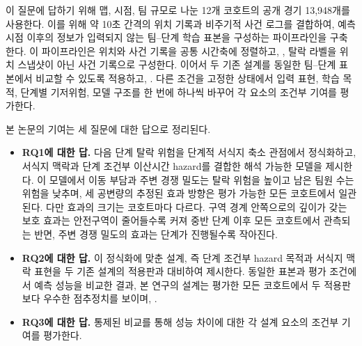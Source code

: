 이 질문에 답하기 위해 맵, 시점, 팀 규모로 나눈 12개 코호트의 공개 경기 13,948개를 사용한다.
이를 위해 약 10초 간격의 위치 기록과 비주기적 사건 로그를 결합하여, 예측 시점 이후의 정보가 입력되지 않는 팀--단계 학습 표본을 구성하는 파이프라인을 구축한다.
이 파이프라인은 위치와 사건 기록을 공통 시간축에 정렬하고, , 탈락 라벨을 위치 스냅샷이 아닌 사건 기록으로 구성한다.
이어서 두 기존 설계를 동일한 팀--단계 표본에서 비교할 수 있도록 적용하고, .
다른 조건을 고정한 상태에서 입력 표현, 학습 목적, 단계별 기저위험, 모델 구조를 한 번에 하나씩 바꾸어 각 요소의 조건부 기여를 평가한다.

본 논문의 기여는 세 질문에 대한 답으로 정리된다.
\begin{itemize}
    \item \textbf{RQ1에 대한 답.}
    다음 단계 탈락 위험을 단계적 서식지 축소 관점에서 정식화하고, 서식지 맥락과 단계 조건부 이산시간 hazard를 결합한 해석 가능한 모델을 제시한다.
    이 모델에서 이동 부담과 주변 경쟁 밀도는 탈락 위험을 높이고 남은 팀원 수는 위험을 낮추며, 세 공변량의 추정된 효과 방향은 평가 가능한 모든 코호트에서 일관된다.
    다만 효과의 크기는 코호트마다 다르다.
    구역 경계 안쪽으로의 깊이가 갖는 보호 효과는 안전구역이 줄어들수록 커져 중반 단계 이후 모든 코호트에서 관측되는 반면, 주변 경쟁 밀도의 효과는 단계가 진행될수록 작아진다.

    \item \textbf{RQ2에 대한 답.}
    이 정식화에 맞춘 설계, 즉 단계 조건부 hazard 목적과 서식지 맥락 표현을 두 기존 설계의 적용판과 대비하여 제시한다.
    동일한 표본과 평가 조건에서 예측 성능을 비교한 결과, 본 연구의 설계는 평가한 모든 코호트에서 두 적용판보다 우수한 점추정치를 보이며, .

    \item \textbf{RQ3에 대한 답.}
    통제된 비교를 통해 성능 차이에 대한 각 설계 요소의 조건부 기여를 평가한다.
\end{itemize}

